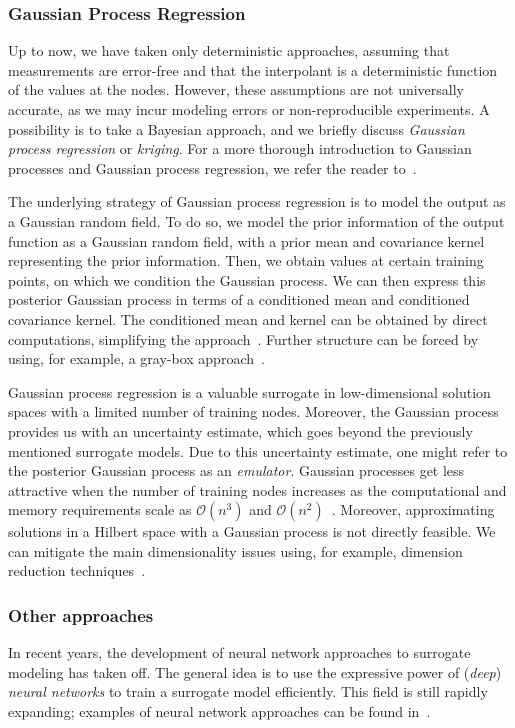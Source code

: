 \subsubsection{Gaussian Process Regression}
Up to now, we have taken only deterministic approaches, assuming that measurements are error-free and that the interpolant is a deterministic function of the values at the nodes.
However, these assumptions are not universally accurate, as we may incur modeling errors or non-reproducible experiments.
A possibility is to take a Bayesian approach, and we briefly discuss \emph{Gaussian process regression} or \emph{kriging}.
For a more thorough introduction to Gaussian processes and Gaussian process regression, we refer the reader to~\cite{rasmussen2000}.

The underlying strategy of Gaussian process regression is to model the output as a Gaussian random field.
To do so, we model the prior information of the output function as a Gaussian random field, with a prior mean and covariance kernel representing the prior information.
Then, we obtain values at certain training points, on which we condition the Gaussian process.
We can then express this posterior Gaussian process in terms of a conditioned mean and conditioned covariance kernel.
The conditioned mean and kernel can be obtained by direct computations, simplifying the approach~\cite{rasmussen2000}.
Further structure can be forced by using, for example, a gray-box approach~\cite{astudillo2022}.

Gaussian process regression is a valuable surrogate in low-dimensional solution spaces with a limited number of training nodes.
Moreover, the Gaussian process provides us with an uncertainty estimate, which goes beyond the previously mentioned surrogate models.
Due to this uncertainty estimate, one might refer to the posterior Gaussian process as an \emph{emulator}.
Gaussian processes get less attractive when the number of training nodes increases as the computational and memory requirements scale as $\mathcal{O}(n^3)$ and $\mathcal{O}(n^2)$~\cite{solin2020}.
Moreover, approximating solutions in a Hilbert space with a Gaussian process is not directly feasible.
We can mitigate the main dimensionality issues using, for example, dimension reduction techniques~\cite{benner2015}.

\subsubsection{Other approaches}
In recent years, the development of neural network approaches to surrogate modeling has taken off.
The general idea is to use the expressive power of (\emph{deep}) \emph{neural networks} to train a surrogate model efficiently.
This field is still rapidly expanding; examples of neural network approaches can be found in~\cite{lu2021,schwab2019}.


